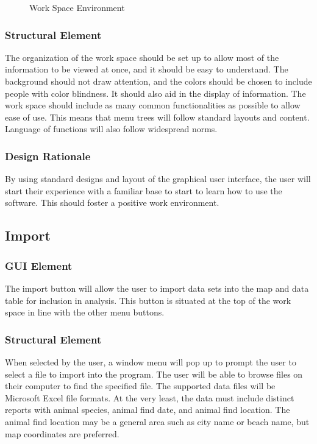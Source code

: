 \documentclass[onecolumn, draftclsnofoot,10pt, compsoc]{IEEEtran}
\begin{document}
\begin{singlespace}
            \begin{figure}[H]
            \caption{Work Space Environment}
            \label{fig:Mockup}
            \end{figure}
            
        \subsubsection{Structural Element}
        The organization of the work space should be set up to allow most of the information to be viewed at once, and it should be easy to understand.  The background should not draw attention, and the colors should be chosen to include people with color blindness.  It should also aid in the display of information.  The work space should include as many common functionalities as possible to allow ease of use.  This means that menu trees will follow standard layouts and content.  Language of functions will also follow widespread norms.
        \subsubsection{Design Rationale}
        By using standard designs and layout of the graphical user interface, the user will start their experience with a familiar base to start to learn how to use the software.  This should foster a positive work environment.
        
    \subsection{Import}
        \subsubsection{GUI Element}
        The import button will allow the user to import data sets into the map and data table for inclusion in analysis. This button is situated at the top of the work space in line with the other menu buttons.
        \subsubsection{Structural Element}
        When selected by the user, a window menu will pop up to prompt the user to select a file to import into the program.  The user will be able to browse files on their computer to find the specified file.  The supported data files will be Microsoft Excel file formats.  At the very least, the data must include distinct reports with animal species, animal find date, and animal find location.  The animal find location may be a general area such as city name or beach name, but map coordinates are preferred.

\end{singlespace}
\end{document}
